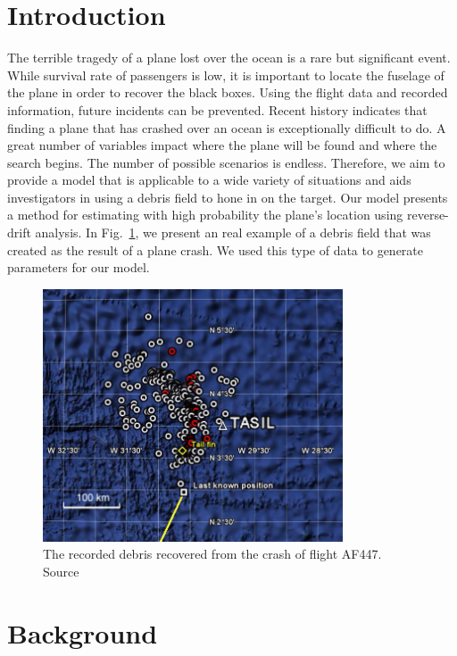 \documentclass[pre,12pt]{revtex4-1}
\begin{document}
\section{Introduction}\label{Introduction}

The terrible tragedy of a plane lost over the ocean is a rare but significant event. While survival rate of passengers is low, it is important to locate the fuselage of the plane in order to recover the black boxes. Using the flight data and recorded information, future incidents can be prevented. Recent history indicates that finding a plane that has crashed over an ocean is exceptionally difficult to do. A great number of variables impact where the plane will be found and where the search begins. The number of possible scenarios is endless. Therefore, we aim to provide a model that is applicable to a wide variety of situations and aids investigators in using a debris field to hone in on the target. Our model presents a method for estimating with high probability the plane's location using reverse-drift analysis. In Fig.~\ref{debrisfield}, we present an real example of a debris field that was created as the result of a plane crash. We used this type of data to generate parameters for our model. 

\begin{figure}[htbp]
\begin{center}
\includegraphics[width=3.5in]{af447DebrisMap.jpg}
\caption{The recorded debris recovered from the crash of flight AF447. Source~\cite{DebrisMapPic}}
\label{debrisfield}
\end{center}
\end{figure}

\section{Background}\label{Background}
\end{document}
